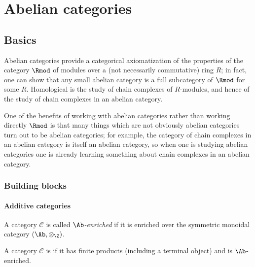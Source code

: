 \documentclass[main.tex]{subfiles}
\begin{document}
\chapter{Abelian categories}
\label{ch:abelian_categories}

\section{Basics}
\label{sec:basics}

Abelian categories provide a categorical axiomatization of the properties of the category $\Rmod$ of modules over a (not necessarily commutative) ring $R$; in fact, one can show that any small abelian category is a full subcategory of $\Rmod$ for some $R$. Homological is the study of chain complexes of $R$-modules, and hence of the study of chain complexes in an abelian category.

One of the benefits of working with abelian categories rather than working directly $\Rmod$ is that many things which are not obviously abelian categories turn out to be abelian categories; for example, the category of chain complexes in an abelian category is itself an abelian category, so when one is studying abelian categories one is already learning something about chain complexes in an abelian category.

\subsection{Building blocks}
\label{ssc:building_blocks}

\subsubsection{Additive categories}

\begin{definition}
  \label{def:ab_enriched_category}
  A category $\mathcal{C}$ is called \emph{$\Ab$-enriched} if it is enriched over the symmetric monoidal category $(\Ab, \otimes_{\Z})$.
\end{definition}


\begin{definition}
  \label{def:additivecategory}
  A category $\mathcal{C}$ is  if it has finite products (including a terminal object) and is $\Ab$-enriched.
\end{definition}
\end{document}

